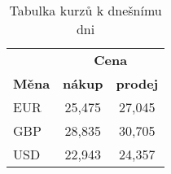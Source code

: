 \documentclass[a4paper,11pt]{article}
\begin{document}
\vspace{10pt}

\begin{table}[h]
    \centering
    \begin{tabular}{| l | c | c |}
        \hline
        & \multicolumn{2}{c|}{\textbf{Cena}} \\ \cline{2-3}
        \textbf{Měna} & \textbf{nákup} & \textbf{prodej} \\ \hline
        EUR & 25,475 & 27,045 \\
        GBP & 28,835 & 30,705 \\
        USD	& 22,943 & 24,357 \\ \hline
    \end{tabular}
    \caption{Tabulka kurzů k dnešnímu dni}
    \label{tab2_1}
\end{table}

\vspace{10pt}
\end{document}
